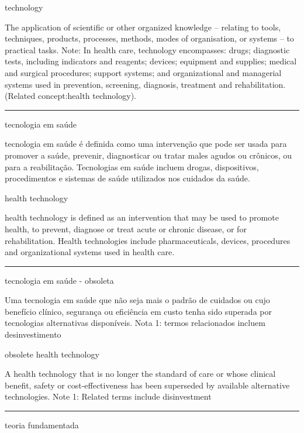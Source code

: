 \documentclass[
]{book}
\begin{document}
technology

The application of scientific or other organized knowledge -- relating to tools, techniques, products, processes, methods, modes of organisation, or systems -- to practical tasks. Note: In health care, technology encompasses: drugs; diagnostic tests, including indicators and reagents; devices; equipment and supplies; medical and surgical procedures; support systems; and organizational and managerial systems used in prevention, screening, diagnosis, treatment and rehabilitation. (Related concept:health technology).

\begin{center}\rule{0.5\linewidth}{0.5pt}\end{center}

tecnologia em saúde

tecnologia em saúde é definida como uma intervenção que pode ser usada para promover a saúde, prevenir, diagnosticar ou tratar males agudos ou crônicos, ou para a reabilitação. Tecnologias em saúde incluem drogas, dispositivos, procedimentos e sistemas de saúde utilizados nos cuidados da saúde.

health technology

health technology is defined as an intervention that may be used to promote health, to prevent, diagnose or treat acute or chronic disease, or for rehabilitation. Health technologies include pharmaceuticals, devices, procedures and organizational systems used in health care.

\begin{center}\rule{0.5\linewidth}{0.5pt}\end{center}

tecnologia em saúde - obsoleta

Uma tecnologia em saúde que não seja mais o padrão de cuidados ou cujo benefício clínico, segurança ou eficiência em custo tenha sido superada por tecnologias alternativas disponíveis. Nota 1: termos relacionados incluem desinvestimento

obsolete health technology

A health technology that is no longer the standard of care or whose clinical benefit, safety or cost-effectiveness has been superseded by available alternative technologies. Note 1: Related terms include disinvestment

\begin{center}\rule{0.5\linewidth}{0.5pt}\end{center}

teoria fundamentada
\end{document}
